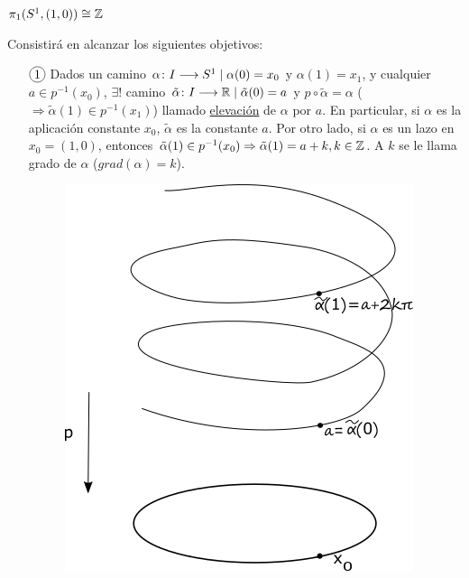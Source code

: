 \documentclass[GTS.tex]{subfiles}
\begin{document}
\begin{teorema}
$\pi_1(S^1,(1,0))\cong\mathbb{Z}$
\end{teorema}

\begin{dem}Consistirá en alcanzar los siguientes objetivos:
\begin{enumerate}
\item[$\circled{1}$] Dados un camino $\alpha\colon{I}\longrightarrow{S^1}\mid\alpha(0)=x_0$ y $\alpha(1)=x_1$, y cualquier $a\in p^{-1}(x_0)$, $\exists!$ camino $\tilde{\alpha}\colon{I}\longrightarrow{\mathbb{R}}\mid\tilde{\alpha}(0)=a$ y $p\circ\tilde{\alpha}=\alpha$ ($\Rightarrow \tilde{\alpha}(1)\in p^{-1}(x_1)$) llamado \underline{elevación} de $\alpha$ por $a$. En particular, si $\alpha$ es la aplicación constante $x_0$, $\tilde{\alpha}$ es la constante $a$. Por otro lado, si $\alpha$ es un lazo en $x_0=(1,0)$, entonces $\tilde{\alpha}(1)\in p^{-1}(x_0)\Rightarrow\tilde{\alpha}(1)=a+k, k\in\mathbb{Z}$. A $k$ se le llama grado de $\alpha$ ($grad(\alpha)=k$).

\begin{figure}[h!]
	\includegraphics[scale=0.5]{text4479}
\end{figure}


\end{enumerate}
\end{dem}
\end{document}
